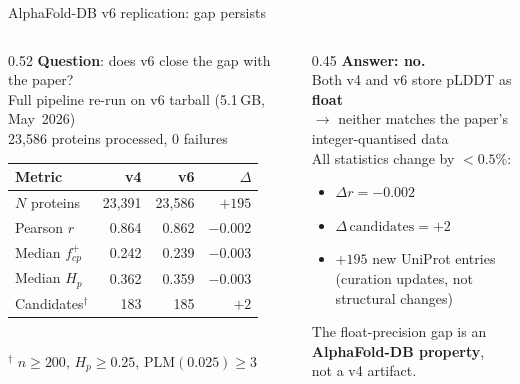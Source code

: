 \documentclass[aspectratio=169, 10pt]{beamer}
\begin{document}
\begin{frame}{AlphaFold-DB v6 replication: gap persists}
  \begin{columns}[T]
    \begin{column}{0.52\textwidth}
      \textbf{Question}: does v6 close the gap with the paper?\\[5pt]
      Full pipeline re-run on v6 tarball (5.1\,GB, May~2026)\\
      23{,}586 proteins processed, 0 failures\\[6pt]

      \begin{tabular}{@{}lrrr@{}}
        \toprule
        Metric & v4 & v6 & $\Delta$ \\
        \midrule
        $N$ proteins           & 23{,}391 & 23{,}586 & $+195$   \\
        Pearson $r$            & 0.864    & 0.862    & $-0.002$ \\
        Median $f^+_{cp}$      & 0.242    & 0.239    & $-0.003$ \\
        Median $H_p$           & 0.362    & 0.359    & $-0.003$ \\
        Candidates$^\dagger$   & 183      & 185      & $+2$     \\
        \bottomrule
      \end{tabular}\\[3pt]
      \footnotesize $^\dagger$ $n\!\geq\!200$,
      $H_p\!\geq\!0.25$, PLM$(0.025)\!\geq\!3$
    \end{column}
    \begin{column}{0.45\textwidth}
      \vspace{4pt}
      \textbf{Answer: no.}\\[6pt]

      Both v4 and v6 store pLDDT as \textbf{float}\\
      $\to$ neither matches the paper's\\
      \hspace{1em}integer-quantised data\\[8pt]

      All statistics change by $<0.5\%$:
      \begin{itemize}\setlength{\itemsep}{2pt}
        \item $\Delta r = -0.002$
        \item $\Delta\,\text{candidates} = +2$
        \item $+195$ new UniProt entries\\
              (curation updates, not\\
              structural changes)
      \end{itemize}
      \vspace{6pt}

      \begin{block}{}
        The float-precision gap is an\\
        \textbf{AlphaFold-DB property},\\
        not a v4 artifact.
      \end{block}
    \end{column}
  \end{columns}
\end{frame}
\end{document}
